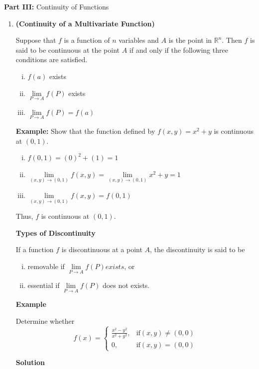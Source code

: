 \documentclass{article}
\begin{document}
\newpage
\noindent \textbf{Part III:} Continuity of Functions
\vspace{-0.2em}
\begin{enumerate}[start=1,label={\bfseries Theorem \arabic*:}, wide=0pt]
    \item \textbf{(Continuity of a Multivariate Function)} 

    Suppose that $f$ is a function of $n$ variables and $A$ is the point in $\mathbb{R}^n$. Then $f$ is said to be continuous at the point $A$ if and only if the following three conditions are satisfied.
\begin{enumerate} [i.]
    \item $f(a)$ exists
    \item $\lim \limits_{P \rightarrow A} f(P)$ exists
    \item $\lim \limits_{P \rightarrow A} f(P) =f(a)$
\end{enumerate}

\textbf{Example:} Show that the function defined by $f(x,y) =x^2+y$ is continuous at $(0,1)$.
\begin{enumerate} [i.]
    \item $f(0,1)=(0)^2+(1)=1$
    \item $\lim \limits_{(x,y) \rightarrow (0,1)} f(x,y)=\lim \limits_{(x,y) \rightarrow (0,1)} x^2+y=1$
    \item $\lim \limits_{(x,y) \rightarrow (0,1)} f(x,y)=f(0,1)$
\end{enumerate}

Thus, $f$ is continuous at $(0,1)$.

\textbf{Types of Discontinuity}

If a function $f$ is discontinuous at a point $A$, the discontinuity is said to be
\begin{enumerate} [i.]
    \item removable if $\lim \limits_{P \rightarrow A} f(P) exists$, or
    \item essential if $\lim \limits_{P \rightarrow A} f(P)$ does not exists.
\end{enumerate}

\textbf{Example}

Determine whether
\[f(x)=
\begin{cases}
    \frac{x^2-y^2}{x^2+y^2}, &\text{if} (x,y) \neq (0,0) \\
    0, &\text{if} (x,y) =(0,0)
\end{cases}
\]

\textbf{Solution}


\end{enumerate}
\end{document}
